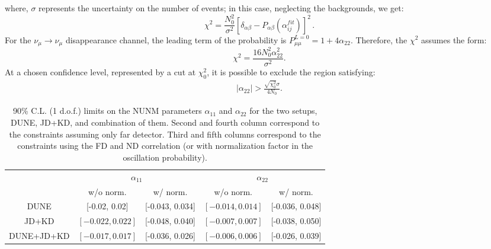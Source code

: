 \documentclass[11pt,a4paper]{article}
\newcommand{\aee}{\ensuremath{\alpha_{11}}}
\newcommand{\amm}{\ensuremath{\alpha_{22}}}
\newcommand{\capdef}{}
\newcommand{\mycaption}[2][\capdef]{\renewcommand{\capdef}{#2}
	\caption[#1]{{\footnotesize #2}}}
\begin{document}
where, $\sigma$ represents the uncertainty on the number of events; in this case, neglecting the backgrounds, we get:
\begin{equation}
    \chi^2=\frac{N_0^2}{\sigma^2}\left[\delta_{\alpha\beta}- P_{\alpha\beta}(\alpha_{ij}^{fit})\right]^2\,.
\label{chi}
\end{equation}
For the $\nu_{\mu}\rightarrow\nu_{\mu}$ disappearance channel, the leading term of the probability is $P_{\mu\mu}^{L=0}=1+4\alpha_{22}$. Therefore, the $\chi^2$ assumes the form:
\begin{equation}
    \chi^2=\frac{16 N_0^2 \alpha_{22}^2}{\sigma^2}.
\end{equation}
At a chosen confidence level, represented by a cut at $\chi^2_{0}$, it is possible to exclude the region satisfying:
\begin{eqnarray}
|\alpha_{22}|>\frac{\sqrt{\chi^2_0}\sigma}{4 N_0}.
\label{chi_dis}
\end{eqnarray}

\begin{table}
	
	\centering
	
	\begin{tabular}{|cc|*{4}{c|}}
		
		\hline\hline
		
		\multicolumn{2}{|c|}{\multirow{2}{*}{}} & \multicolumn{2}{|c}{$\alpha_{11}$} & \multicolumn{2}{|c|}{$\alpha_{22}$}\\
		
		\cline{3-6}
		
		\multicolumn{2}{|c|}{Expt.} & w/o norm. & w/ norm. & w/o norm. & w/ norm. \\
		
		\hline\hline
		
		\multicolumn{2}{|c|}{DUNE} & [-0.02, 0.02] & [-0.043, 0.034] &  $[-0.014, 0.014]$& [-0.036, 0.048]   \\
		
		
		\hline\hline
		
		\multicolumn{2}{|c|}{JD+KD} &  $[-0.022, 0.022]$ & [-0.048, 0.040]  &  $[-0.007, 0.007]$& [-0.038, 0.050] \\
		\hline\hline
		
		\multicolumn{2}{|c|}{DUNE+JD+KD} & $[-0.017, 0.017]$ & [-0.036, 0.026]  &  $[-0.006, 0.006]$& [-0.026, 0.039]   \\
		\hline
		
		
		
		
		\hline
		\hline
		
	\end{tabular}
	\mycaption{90\% C.L. (1 d.o.f.) limits on the NUNM parameters $\aee$ and $\amm$ for the two setups, DUNE, JD+KD, and combination of them. Second  and fourth column correspond to the constraints assuming only far detector. Third and fifth columns correspond to the constraints using the FD and ND correlation (or with normalization factor in the oscillation probability). }
	\label{Table:cons_w_norm}
\end{table}
\end{document}
